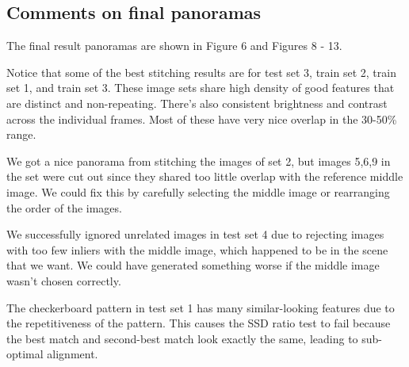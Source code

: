 \documentclass[conference]{IEEEtran}
\begin{document}
\subsection{Comments on final panoramas}
The final result panoramas are shown in Figure 6 and Figures 8 - 13.

Notice that some of the best stitching results are for test set 3,
train set 2, train set 1, and train set 3. These image sets share high density of good features 
that are distinct and non-repeating. There's also consistent brightness and contrast 
across the individual frames. Most of these have very nice overlap in the 30-50\% range.

We got a nice panorama from stitching the images of set 2, but images 5,6,9 in the set were cut out 
since they shared too little overlap with the reference middle image. We could fix this by 
carefully selecting the middle image or rearranging the order of the images.

We successfully ignored unrelated images in test set 4 due to rejecting images with too 
few inliers with the middle image, which happened to be in the scene that we want. We could 
have generated something worse if the middle image wasn't chosen correctly.

The checkerboard pattern in test set 1 has many similar-looking features due to the 
repetitiveness of the pattern. This causes the SSD ratio test to fail because the best 
match and second-best match look exactly the same, leading to sub-optimal alignment. 


%
%
\end{document}

